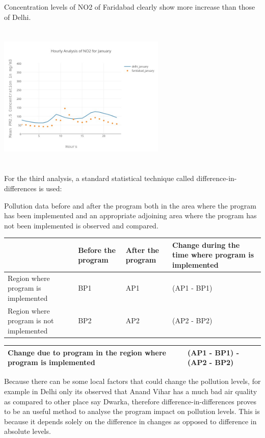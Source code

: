 \documentclass{report}
\begin{document}
Concentration levels of NO2 of Faridabad clearly show more increase than those of Delhi.

\graphicspath{ {report/} }
\includegraphics[width=8cm, height=7cm]{Linechart_January_NO2}

For the third analysis, a standard statistical technique called difference-in-differences is used:

Pollution data before and after the program both in the area where the program has been implemented and an appropriate adjoining area where the program has not been implemented is observed and compared.

\begin{tabular}{ | m{5em} | m{1cm}| m{1cm} | m{2.5cm} | } 
\hline
 & Before the program & After the program & Change during the time where program is implemented\\ 
\hline
Region where program is implemented & BP1 & AP1 & (AP1 - BP1) \\ 
\hline
Region where program is not implemented & BP2 & AP2 & (AP2 - BP2) \\ 
\hline
\end{tabular}

\begin{tabular}{ |m{4cm} | m{2.9cm} | } 
\hline
Change due to program in the region where program is implemented & (AP1 - BP1) - (AP2 - BP2) \\ 
\hline
\end{tabular}

Because there can be some local factors that could change the pollution levels, for example in Delhi only its observed that Anand Vihar has a much bad air quality as compared to other place say Dwarka, therefore difference-in-differences proves to be an useful method to analyse the program impact on pollution levels. This is because it depends solely on the difference in changes as opposed to difference in absolute levels.\cite{Odd-Even-Program}
\end{document}
